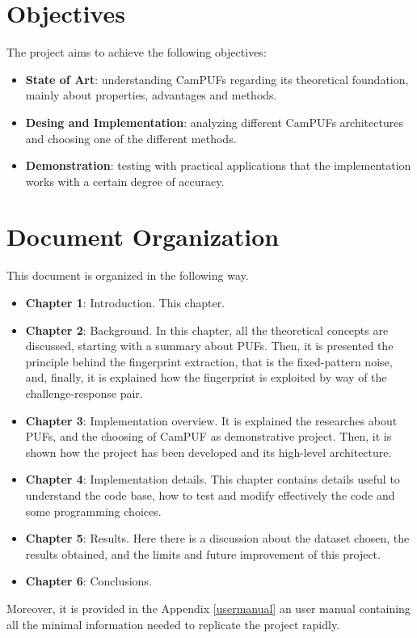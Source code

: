 \section {Objectives}
The project aims to achieve the following objectives:
\begin{itemize}
    \item \textbf{State of Art}: understanding CamPUFs regarding its theoretical foundation, mainly about properties, advantages and methods.
    

    \item \textbf{Desing and Implementation}: analyzing different CamPUFs architectures and choosing one of the different methods.
    
    
    \item \textbf{Demonstration}: testing with practical applications that the implementation works with a certain degree of accuracy.

\end{itemize}

\section {Document Organization}
This document is organized in the following way.
\begin{itemize}
\item \textbf{Chapter 1}: Introduction. This chapter.
\item \textbf{Chapter 2}: Background. In this chapter, all the theoretical concepts are discussed, starting with a summary about PUFs. Then, it is presented the principle behind the fingerprint extraction, that is the fixed-pattern noise, and, finally, it is explained how the fingerprint is exploited by way of the challenge-response pair.
\item \textbf{Chapter 3}: Implementation overview. It is explained the researches about PUFs, and the choosing of CamPUF as demonstrative project. Then, it is shown how the project has been developed and its high-level architecture.
\item \textbf{Chapter 4}: Implementation details. This chapter contains details useful to understand the code base, how to test and modify effectively the code and some programming choices.
\item \textbf{Chapter 5}: Results. Here there is a discussion about the dataset chosen, the results obtained, and the limits and future improvement of this project.
\item \textbf{Chapter 6}: Conclusions.
\end{itemize}
Moreover, it is provided in the Appendix \ref{usermanual} an user manual containing all the minimal information needed to replicate the project rapidly.
